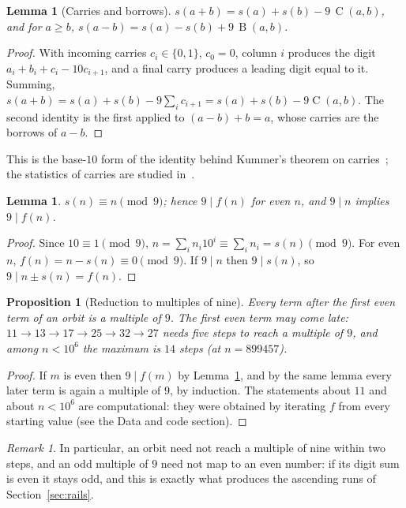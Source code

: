\documentclass[11pt]{article}
\newtheorem{lemma}[theorem]{Lemma}
\newtheorem{proposition}[theorem]{Proposition}
\theoremstyle{definition}
\theoremstyle{remark}
\newtheorem{remark}[theorem]{Remark}
\newcommand{\C}{\operatorname{C}}
\newcommand{\B}{\operatorname{B}}
\begin{document}
\begin{lemma}[Carries and borrows]\label{lem:carry}
$s(a+b)=s(a)+s(b)-9\,\C(a,b)$, and for $a\ge b$,
$s(a-b)=s(a)-s(b)+9\,\B(a,b)$.
\end{lemma}

\begin{proof}
With incoming carries $c_i\in\{0,1\}$, $c_0=0$, column $i$ produces the digit
$a_i+b_i+c_i-10c_{i+1}$, and a final carry produces a leading digit equal to
it. Summing, $s(a+b)=s(a)+s(b)-9\sum_i c_{i+1}=s(a)+s(b)-9\C(a,b)$. The
second identity is the first applied to $(a-b)+b=a$, whose carries are the
borrows of $a-b$.
\end{proof}

This is the base-$10$ form of the identity behind Kummer's theorem on
carries~\cite{Kummer}; the statistics of carries are studied
in~\cite{Holte,DiaconisFulman}.

\begin{lemma}\label{lem:mod9}
$s(n)\equiv n\pmod9$; hence $9\mid f(n)$ for even $n$, and $9\mid n$
implies $9\mid f(n)$.
\end{lemma}

\begin{proof}
Since $10\equiv1\pmod9$, $n=\sum_in_i10^i\equiv\sum_in_i=s(n)\pmod9$. For even
$n$, $f(n)=n-s(n)\equiv0\pmod9$. If $9\mid n$ then $9\mid s(n)$, so
$9\mid n\pm s(n)=f(n)$.
\end{proof}

\begin{proposition}[Reduction to multiples of nine]\label{prop:nine}
Every term after the first even term of an orbit is a multiple of $9$. The
first even term may come late: $11\to13\to17\to25\to32\to27$ needs five steps
to reach a multiple of $9$, and among $n<10^6$ the maximum is $14$ steps
(at $n=899457$).
\end{proposition}

\begin{proof}
If $m$ is even then $9\mid f(m)$ by Lemma~\ref{lem:mod9}, and by the same lemma
every later term is again a multiple of $9$, by induction. The statements about
$11$ and about $n<10^6$ are computational: they were obtained by iterating $f$
from every starting value (see the Data and code section).
\end{proof}

\begin{remark}
In particular, an orbit need not reach a multiple of nine within two steps,
and an odd multiple of $9$ need not map to an even number: if its digit sum
is even it stays odd, and this is exactly what produces the ascending runs of
Section~\ref{sec:rails}.
\end{remark}
\end{document}
